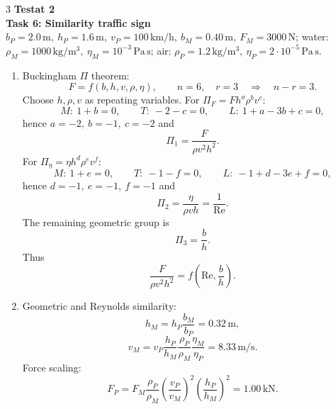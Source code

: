 \documentclass[9pt, landscape, a4paper]{article}
\begin{document}
\begin{multicols*}{3}
\textbf{Testat 2}\\
\textbf{Task 6: Similarity traffic sign}\\
$b_P=2.0\,\mathrm{m},\ h_P=1.6\,\mathrm{m},\
v_P=100\,\mathrm{km/h},\ b_M=0.40\,\mathrm{m},\
F_M=3000\,\mathrm{N}$; water:
$\rho_M=1000\,\mathrm{kg/m^3},\ \eta_M=10^{-3}\,\mathrm{Pa\,s}$;
air: $\rho_P=1.2\,\mathrm{kg/m^3},\
\eta_P=2\cdot10^{-5}\,\mathrm{Pa\,s}$.
\begin{enumerate}[label=(\alph*)]
  \item Buckingham $\Pi$ theorem:
    \[
      F=f(b,h,v,\rho,\eta),\qquad n=6,\quad r=3
      \quad\Rightarrow\quad n-r=3.
    \]
    Choose $h,\rho,v$ as repeating variables. For
    $\Pi_F=Fh^a\rho^bv^c$:
    \[
      M:\ 1+b=0,\qquad
      T:\ -2-c=0,\qquad
      L:\ 1+a-3b+c=0,
    \]
    hence $a=-2,\ b=-1,\ c=-2$ and
    \[
      \Pi_1=\frac{F}{\rho v^2h^2}.
    \]
    For $\Pi_\eta=\eta h^d\rho^ev^f$:
    \[
      M:\ 1+e=0,\qquad
      T:\ -1-f=0,\qquad
      L:\ -1+d-3e+f=0,
    \]
    hence $d=-1,\ e=-1,\ f=-1$ and
    \[
      \Pi_2=\frac{\eta}{\rho vh}=\frac{1}{\mathrm{Re}}.
    \]
    The remaining geometric group is
    \[
      \Pi_3=\frac{b}{h}.
    \]
    Thus
    \[
      \frac{F}{\rho v^2h^2}
      =f\left(\mathrm{Re},\frac{b}{h}\right).
    \]
  \item Geometric and Reynolds similarity:
    \[
      h_M=h_P\frac{b_M}{b_P}=0.32\,\mathrm{m},
    \]
    \[
      v_M=v_P\frac{h_P}{h_M}
      \frac{\rho_P}{\rho_M}\frac{\eta_M}{\eta_P}
      =8.33\,\mathrm{m/s}.
    \]
    Force scaling:
    \[
      F_P=F_M\frac{\rho_P}{\rho_M}
      \left(\frac{v_P}{v_M}\right)^2
      \left(\frac{h_P}{h_M}\right)^2
      =1.00\,\mathrm{kN}.
    \]
\end{enumerate}


\end{multicols*}
\end{document}
